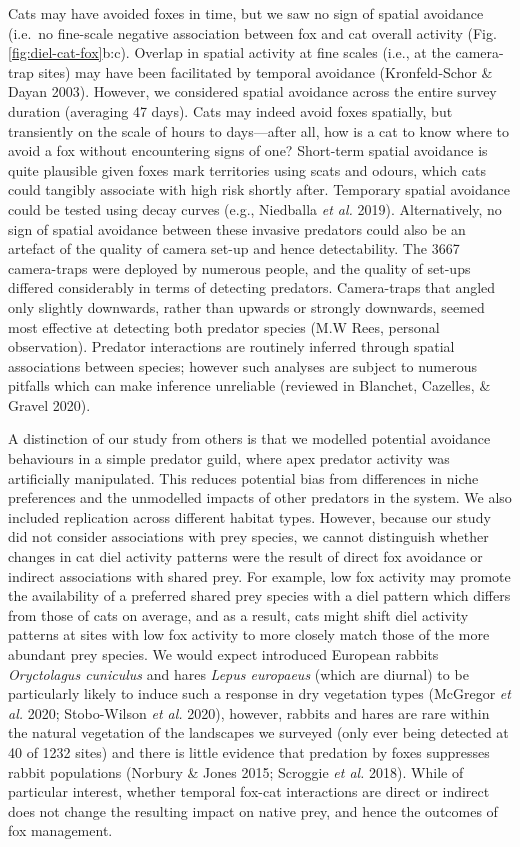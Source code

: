 \documentclass[]{elsarticle} %
\begin{document}
Cats may have avoided foxes in time, but we saw no sign of spatial avoidance (i.e.~no fine-scale negative association between fox and cat overall activity (Fig. \ref{fig:diel-cat-fox}b:c). Overlap in spatial activity at fine scales (i.e., at the camera-trap sites) may have been facilitated by temporal avoidance (Kronfeld-Schor \& Dayan 2003). However, we considered spatial avoidance across the entire survey duration (averaging 47 days). Cats may indeed avoid foxes spatially, but transiently on the scale of hours to days---after all, how is a cat to know where to avoid a fox without encountering signs of one? Short-term spatial avoidance is quite plausible given foxes mark territories using scats and odours, which cats could tangibly associate with high risk shortly after. Temporary spatial avoidance could be tested using decay curves (e.g., Niedballa \emph{et al.} 2019). Alternatively, no sign of spatial avoidance between these invasive predators could also be an artefact of the quality of camera set-up and hence detectability. The 3667 camera-traps were deployed by numerous people, and the quality of set-ups differed considerably in terms of detecting predators. Camera-traps that angled only slightly downwards, rather than upwards or strongly downwards, seemed most effective at detecting both predator species (M.W Rees, personal observation). Predator interactions are routinely inferred through spatial associations between species; however such analyses are subject to numerous pitfalls which can make inference unreliable (reviewed in Blanchet, Cazelles, \& Gravel 2020).

A distinction of our study from others is that we modelled potential avoidance behaviours in a simple predator guild, where apex predator activity was artificially manipulated. This reduces potential bias from differences in niche preferences and the unmodelled impacts of other predators in the system. We also included replication across different habitat types. However, because our study did not consider associations with prey species, we cannot distinguish whether changes in cat diel activity patterns were the result of direct fox avoidance or indirect associations with shared prey. For example, low fox activity may promote the availability of a preferred shared prey species with a diel pattern which differs from those of cats on average, and as a result, cats might shift diel activity patterns at sites with low fox activity to more closely match those of the more abundant prey species. We would expect introduced European rabbits \emph{Oryctolagus cuniculus} and hares \emph{Lepus europaeus} (which are diurnal) to be particularly likely to induce such a response in dry vegetation types (McGregor \emph{et al.} 2020; Stobo-Wilson \emph{et al.} 2020), however, rabbits and hares are rare within the natural vegetation of the landscapes we surveyed (only ever being detected at 40 of 1232 sites) and there is little evidence that predation by foxes suppresses rabbit populations (Norbury \& Jones 2015; Scroggie \emph{et al.} 2018). While of particular interest, whether temporal fox-cat interactions are direct or indirect does not change the resulting impact on native prey, and hence the outcomes of fox management.
\end{document}
